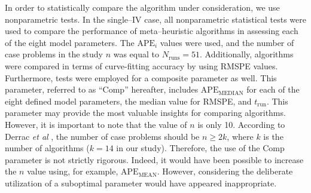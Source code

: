 \documentclass[a4paper,fleqn]{cas-dc}
\begin{document}
In order to statistically compare the algorithm under consideration, we use nonparametric tests.
In the single--IV case, all nonparametric statistical tests were used to compare the performance of meta--heuristic algorithms in assessing each of the eight model parameters.
The $\mathrm{APE}_i$ values were used, and the number of case problems in the study $n$ was equal to $N_\mathrm{runs}=51$.
Additionally, algorithms were compared in terms of curve-fitting accuracy by using RMSPE values.
Furthermore, tests were employed for a composite parameter as well.
This parameter, referred to as ``Comp'' hereafter, includes $\mathrm{APE}_\mathrm{MEDIAN}$ for each of the eight defined model parameters,
the median value for RMSPE, and $t_\mathrm{run}$.
This parameter may provide the most valuable insights for comparing algorithms. However, it is important to note that the value of $n$ is only 10.
According to Derrac \emph{et al} \cite{Derrac2011}, the number of case problems should be $n\geq 2k$,
where $k$ is the number of algorithms ($k=14$ in our study).
Therefore, the use of the Comp parameter is not strictly rigorous.
Indeed, it would have been possible to increase the $n$ value using, for example, $\mathrm{APE}_\mathrm{MEAN}$.
However, considering the deliberate utilization of a suboptimal parameter would have appeared inappropriate.
\end{document}
